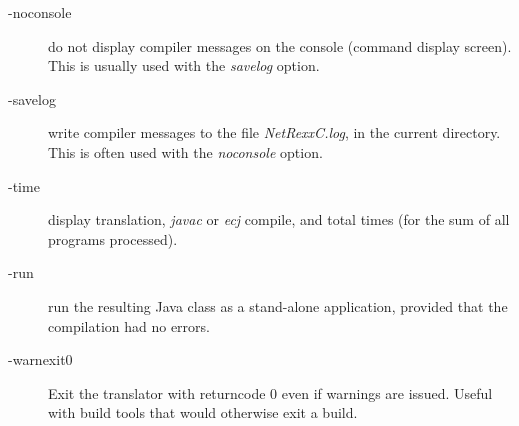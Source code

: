 \begin{description}
\item[-noconsole]
do not display compiler messages on the console (command display
screen).  This is usually used with the \emph{savelog} option.
\item[-savelog]
write compiler messages to the file \emph{NetRexxC.log}, in the current
directory.
This is often used with the \emph{noconsole} option.
\item[-time]
display translation, \emph{javac} or \emph{ecj} compile, and total times (for the sum
of all programs processed).
\item[-run]
run the resulting Java class as a stand-alone application, provided that
the compilation had no errors.
\item[-warnexit0]
Exit the translator with returncode 0 even if warnings are issued. Useful with build tools that would otherwise exit a build.
\end{description}
